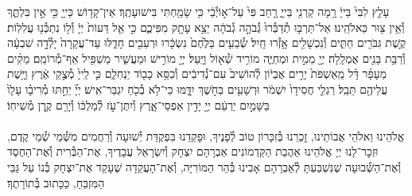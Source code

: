 \documentclass[twoside, openany, parskip=half, 11pt]{book}
\begin{document}
 
עָלַ֤ץ לִבִּי֙ בַּייָ֔ רָ֥מָה קַרְנִ֖י בַּייָ֑ רָ֤חַב פִּי֙ עַל־א֣וֹיְ֯בַ֔י כִּ֥י שָׂמַ֖חְתִּי בִּישׁוּעָתֶֽךָ׃ אֵין־קָד֥וֹשׁ כַּייָ֖ כִּ֣י אֵ֣ין בִּלְתֶּ֑ךָ וְ֯אֵ֥ין צ֖וּר כֵּאלֹהֵֽינוּ׃ אַל־תַּרְבּ֤וּ תְ֯דַבְּ֯רוּ֙ גְּ֯בֹהָ֣ה גְ֯בֹהָ֔ה יֵצֵ֥א עָתָ֖ק מִפִּיכֶ֑ם כִּ֣י אֵ֤ל דֵּעוֹת֙ יְיָ֔ וְ֯ל֥וֹ נִתְכְּ֯נ֖וּ עֲלִלֽוֹת׃ קֶ֥שֶׁת גִּבֹּרִ֖ים חַתִּ֑ים וְ֯נִכְשָׁלִ֖ים אָ֥זְ֯רוּ חָֽיִל׃ שְׂ֯בֵעִ֤ים בַּלֶּ֙חֶם֙ נִשְׂכָּ֔רוּ וּרְעֵבִ֖ים חָדֵ֑לּוּ עַד־עֲקָרָה֙ יָלְ֯דָ֣ה שִׁבְעָ֔ה וְ֯רַבַּ֥ת בָּנִ֖ים אֻמְלָֽלָה׃ יְיָ֖ מֵמִ֣ית וּמְחַיֶּ֑ה מוֹרִ֥יד שְׁ֯א֖וֹל וַיָּֽעַל׃ יְיָ֖ מוֹרִ֣ישׁ וּמַעֲשִׁ֑יר מַשְׁפִּ֖יל אַף־מְ֯רוֹמֵֽם׃ מֵקִ֨ים מֵעָפָ֜ר דָּ֗ל מֵֽאַשְׁפֹּת֙ יָרִ֣ים אֶבְי֔וֹן לְ֯הוֹשִׁיב֙ עִם־נְ֯דִיבִ֔ים וְ֯כִסֵּ֥א כָב֖וֹד יַנְחִלֵ֑ם כִּ֤י לַֽייָ֙ מְ֯צֻ֣קֵי אֶ֔רֶץ וַיָּ֥שֶׁת עֲלֵיהֶ֖ם תֵּבֵֽל׃ רַגְלֵ֤י חֲסִידָו֙ יִשְׁמֹ֔ר וּרְשָׁעִ֖ים בַּחֹ֣שֶׁךְ יִדׇּ֑מּוּ כִּי־לֹ֥א בְ֯כֹ֖חַ יִגְבַּר־אִֽישׁ׃ יְיָ֞ יֵחַ֣תּוּ מְ֯רִיבָ֗ו עָלָו֙ בַּשָּׁמַ֣יִם יַרְעֵ֔ם יְיָ֖ יָדִ֣ין אַפְסֵי־אָ֑רֶץ וְ֯יִתֶּן־עֹ֣ז לְ֯מַלְכּ֔וֹ וְ֯יָרֵ֖ם קֶ֥רֶן מְ֯שִׁיחֽוֹ׃\\
\\
אֱלֹהֵינוּ וֵאלֹהֵי אֲבוֹתֵינוּ, זׇכְרֵנוּ בְּ֯זִכָּרוֹן טוֹב לְ֯פָנֶיךָ, וּפׇקְדֵנוּ בִּפְקֻדַּת יְ֯שׁוּעָה וְ֯רַחֲמִים מִשְּׁ֯מֵי שְׁ֯מֵי קֶדֶם, וּזְכׇר־לָנוּ יְיָ אֱלֹהֵינוּ אַהֲבַת הַקַּדְמוֹנִים אַבְרָהָם יִצְחָק וְ֯יִשְׂרָאֵל עֲבָדֶיךָ, אֶת־הַבְּ֯רִית וְ֯אֶת־הַחֶסֶד וְ֯אֶת־הַשְּׁ֯בוּעָה שֶׁנִּשְׁבַּעְתָּ לְ֯אַבְרָהָם אָבִינוּ בְּ֯הַר הַמּוֹרִיָּה, וְ֯אֶת־הָעֲקֵדָה שֶׁעָקַד אֶת־יִצְחָק בְּ֯נוֹ עַל גַּבֵּי הַמִּזְבֵּחַ, כַּכָּתוּב בְּ֯תוֹרָתֶךָ׃\\
\end{document}
